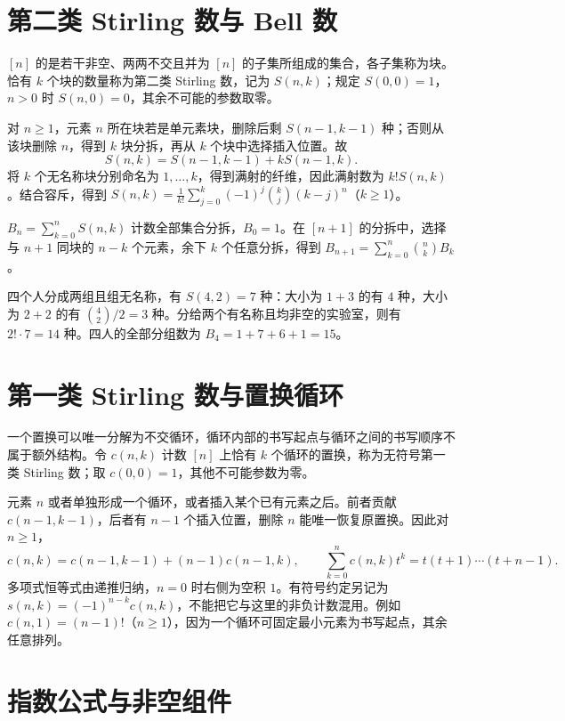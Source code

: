 \documentclass[UTF8,12pt,a4paper,fontset=fandol]{ctexbook}
\begin{document}
\section{第二类 Stirling 数与 Bell 数}

\begin{definition}
$[n]$ 的是若干非空、两两不交且并为 $[n]$ 的子集所组成的集合，各子集称为块。恰有 $k$ 个块的数量称为第二类 Stirling 数，记为 $S(n,k)$；规定 $S(0,0)=1$，$n>0$ 时 $S(n,0)=0$，其余不可能的参数取零。
\end{definition}

对 $n\ge1$，元素 $n$ 所在块若是单元素块，删除后剩 $S(n-1,k-1)$ 种；否则从该块删除 $n$，得到 $k$ 块分拆，再从 $k$ 个块中选择插入位置。故
\[
 S(n,k)=S(n-1,k-1)+kS(n-1,k).
\]
将 $k$ 个无名称块分别命名为 $1,\ldots,k$，得到满射的纤维，因此满射数为 $k!S(n,k)$。结合容斥，得到 $S(n,k)=\frac1{k!}\sum_{j=0}^k(-1)^j\binom kj(k-j)^n$（$k\ge1$）。

 $B_n=\sum_{k=0}^nS(n,k)$ 计数全部集合分拆，$B_0=1$。在 $[n+1]$ 的分拆中，选择与 $n+1$ 同块的 $n-k$ 个元素，余下 $k$ 个任意分拆，得到 $B_{n+1}=\sum_{k=0}^n\binom nkB_k$。

\begin{example}
四个人分成两组且组无名称，有 $S(4,2)=7$ 种：大小为 $1+3$ 的有 $4$ 种，大小为 $2+2$ 的有 $\binom42/2=3$ 种。分给两个有名称且均非空的实验室，则有 $2!\cdot7=14$ 种。四人的全部分组数为 $B_4=1+7+6+1=15$。
\end{example}

\section{第一类 Stirling 数与置换循环}

一个置换可以唯一分解为不交循环，循环内部的书写起点与循环之间的书写顺序不属于额外结构。令 $c(n,k)$ 计数 $[n]$ 上恰有 $k$ 个循环的置换，称为无符号第一类 Stirling 数；取 $c(0,0)=1$，其他不可能参数为零。

元素 $n$ 或者单独形成一个循环，或者插入某个已有元素之后。前者贡献 $c(n-1,k-1)$，后者有 $n-1$ 个插入位置，删除 $n$ 能唯一恢复原置换。因此对 $n\ge1$，
\[
 c(n,k)=c(n-1,k-1)+(n-1)c(n-1,k),\qquad
 \sum_{k=0}^n c(n,k)t^k=t(t+1)\cdots(t+n-1).
\]
多项式恒等式由递推归纳，$n=0$ 时右侧为空积 $1$。有符号约定另记为 $s(n,k)=(-1)^{n-k}c(n,k)$，不能把它与这里的非负计数混用。例如 $c(n,1)=(n-1)!$（$n\ge1$），因为一个循环可固定最小元素为书写起点，其余任意排列。

\section{指数公式与非空组件}
\end{document}
